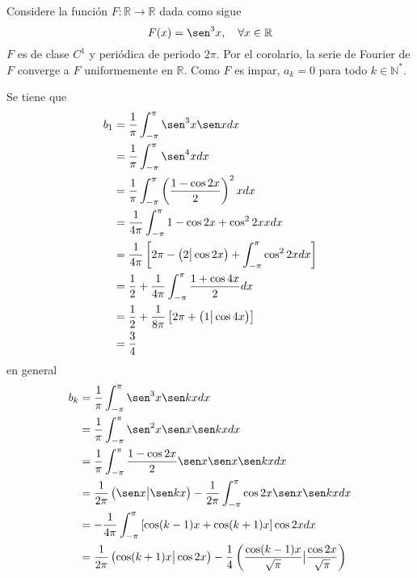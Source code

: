 \documentclass[12pt]{report}
\newcounter{it}
\theoremstyle{largebreak}
\newcommand\cf[3]{\ensuremath{#1:#2\rightarrow#3}}
\newcommand\pint[2]{\ensuremath{\left(#1\big| #2\right)}}
\begin{document}
    \begin{exa}
        Considere la función $\cf{F}{\mathbb{R}}{\mathbb{R}}$ dada como sigue
        \begin{equation*}
             F(x)=\sen^3 x,\quad\forall x\in\mathbb{R}
        \end{equation*}
        $F$ es de clase $C^1$ y periódica de periodo $2\pi$. Por el corolario, la serie de Fourier de $F$ converge a $F$ uniformemente en $\mathbb{R}$. Como $F$ es impar, $a_k=0$ para todo $k\in\mathbb{N}^*$.

        Se tiene que
        \begin{equation*}
            \begin{split}
                b_1&=\frac{1}{\pi}\int_{ -\pi}^\pi \sen^3 x\sen xdx\\
                &=\frac{1}{\pi}\int_{ -\pi}^\pi \sen^4 xdx\\
                &=\frac{1}{\pi}\int_{ -\pi}^\pi \left(\frac{1-\cos 2x}{2} \right)^2 xdx\\
                &=\frac{1}{4\pi}\int_{ -\pi}^\pi 1-\cos 2x+\cos^2 2x xdx\\
                &=\frac{1}{4\pi}\left[2\pi-\pint{2}{\cos 2x}+\int_{ -\pi}^\pi\cos^2 2xdx \right] \\
                &=\frac{1}{2}+\frac{1}{4\pi}\int_{ -\pi}^\pi\frac{1+\cos 4x}{2}dx\\
                &=\frac{1}{2}+\frac{1}{8\pi}\left[2\pi+\pint{1}{\cos 4x} \right] \\
                &=\frac{3}{4}\\
            \end{split}
        \end{equation*}
        en general
        \begin{equation*}
            \begin{split}
                b_k&=\frac{1}{\pi}\int_{-\pi}^\pi\sen^3x\sen kxdx\\
                &=\frac{1}{\pi}\int_{-\pi}^\pi\sen^2x\sen x \sen kxdx\\
                &=\frac{1}{\pi}\int_{-\pi}^\pi\frac{1-\cos 2x}{2}\sen x\sen x \sen kxdx\\
                &=\frac{1}{2\pi}\pint{\sen x}{\sen kx}-\frac{1}{2\pi}\int_{-\pi}^\pi\cos2x\sen x\sen kxdx\\
                &=-\frac{1}{4\pi}\int_{-\pi}^\pi\left[\cos(k-1)x+\cos(k+1)x \right]\cos 2xdx \\
                &=\frac{1}{2\pi}\pint{\cos (k+1)x}{\cos 2x}-\frac{1}{4}\pint{\frac{\cos (k-1)x}{\sqrt{\pi}}}{\frac{\cos 2x}{\sqrt{\pi}}}\\

\end{split}
\end{equation*}
\end{exa}
\end{document}

